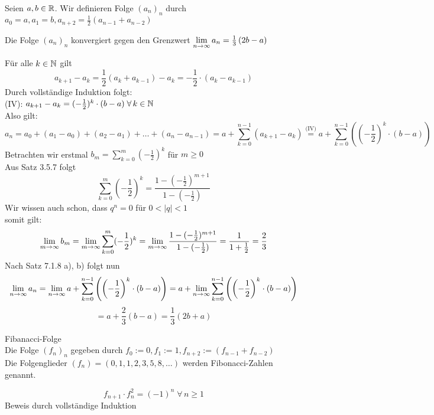 \documentclass[../ana1u.tex]{subfiles}
\begin{document}
\begin{bsp} 
    Seien \(a, b \in \mathbb{R}\). Wir definieren Folge \((a_n)_n\) durch \(a_0 = a, a_1 = b, a_{n+2} = \frac{1}{2}\left(a_{n-1} + a_{n-2}\right)\)\\
    \begin{beh}
        Die Folge \((a_n)_n\) konvergiert gegen den Grenzwert \(\lim\limits_{n\rightarrow\infty} a_n = \frac{1}{3}\left(2b - a\right)\)
    \end{beh}
    \begin{bew}
        Für alle \(k \in \mathbb{N}\) gilt
        \[a_{k+1} - a_k = \frac{1}{2}\left(a_{k} + a_{k-1}\right) - a_k = -\frac{1}{2} \cdot (a_k - a_{k-1})\]
        Durch vollständige Induktion folgt:\\
        (IV): \(a_{k+1} - a_k =  (-\frac{1}{2})^k \cdot (b - a) \; \forall \, k \in \mathbb{N}\)\\
        Also gilt:
        \[a_n = a_0 + (a_1 - a_0) + (a_2 - a_1) + \dots + (a_n - a_{n-1}) = a + \sum_{k=0}^{n-1}(a_{k+1} - a_k) \overset{\text{(IV)}}{=} a + \sum_{k=0}^{n-1} \left(\left(-\frac{1}{2}\right)^k \cdot (b - a)\right)\]
        Betrachten wir erstmal \(b_m = \sum_{k=0}^{m} (-\frac{1}{2})^k\) für \(m \geq 0\)\\
        Aus Satz 3.5.7 folgt
        \[\sum_{k=0}^{m} (-\frac{1}{2})^k = \frac{1-(-\frac{1}{2})^{m+1}}{1-(-\frac{1}{2})}\]
        Wir wissen auch schon, dass \(q^n = 0\) für \(0 < |q| < 1\)\\
        somit gilt:
        \[\lim\limits_{m\rightarrow\infty} b_m = \lim\limits_{m\rightarrow\infty} \sum_{k=0}^{m} (-\frac{1}{2})^k = \lim\limits_{m\rightarrow\infty} \frac{1-(-\frac{1}{2})^{m+1}}{1-(-\frac{1}{2})} = \frac{1}{1 + \frac{1}{2}} = \frac{2}{3}\]
        Nach Satz 7.1.8 a), b) folgt nun
        \[\lim\limits_{n\rightarrow\infty} a_n = \lim\limits_{n\rightarrow\infty} a + \sum_{k=0}^{n-1} \left(\left(-\frac{1}{2}\right)^k \cdot (b - a)\right) = a + \lim\limits_{n\rightarrow\infty} \sum_{k=0}^{n-1} \left(\left(-\frac{1}{2}\right)^k \cdot (b - a)\right)\]
        \[= a + \frac{2}{3}(b - a) = \frac{1}{3}(2b + a)\]
    \end{bew}
\end{bsp}
\begin{defi}
    Fibanacci-Folge\\
    Die Folge \((f_n)_n\) gegeben durch \(f_0 := 0, f_1 := 1, f_{n+2} := (f_{n-1} + f_{n-2})\)\\
    Die Folgenglieder \((f_n) = (0, 1, 1, 2, 3, 5, 8, \dots)\) werden Fibonacci-Zahlen genannt.
\end{defi}
\begin{beh}[1]
    \[f_{n+1} \cdot f_n^2 = (-1)^n \; \forall \, n \geq 1\]
    Beweis durch vollständige Induktion
\end{beh}
\end{document}
